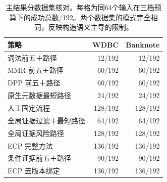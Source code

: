 \begin{table}[t]
\caption{主结果分数据集核对。每格为同64个输入在三档预算下的成功总数/192。两个数据集的模式完全相同，反映构造语义主导的限制。}\label{tab:network-datasets}
\centering\small
\begin{tabularx}{\columnwidth}{Xrr}
\toprule
策略 & WDBC & Banknote \\
\midrule
词法前五＋路径 & 12/192 & 12/192 \\
MMR 前五＋路径 & 60/192 & 60/192 \\
DPP 前五＋路径 & 60/192 & 60/192 \\
原生元数据最短路径 & 24/192 & 24/192 \\
人工固定流程 & 128/192 & 128/192 \\
全局证据过滤＋最短路径 & 64/192 & 64/192 \\
全局证据风险路径 & 128/192 & 128/192 \\
ECP 完整方法 & 136/192 & 136/192 \\
条件证据前五＋路径 & 90/192 & 90/192 \\
ECP 去版本绑定 & 136/192 & 136/192 \\
\bottomrule
\end{tabularx}
\end{table}
